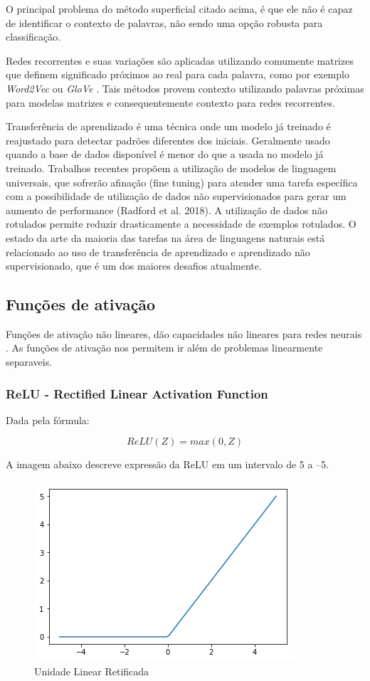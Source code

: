 \documentclass[12pt]{article}
\begin{document}
O principal problema do método superficial citado acima, é que ele não é capaz de identificar o contexto de palavras, não sendo uma opção robusta para classificação.

Redes recorrentes e suas variações são aplicadas utilizando comumente matrizes que definem significado próximos ao real para cada palavra, como por exemplo \textit{Word2Vec} \cite{DBLP:journals/corr/abs-1301-3781} ou \textit{GloVe} \cite{pennington2014glove}. Tais métodos provem contexto utilizando palavras próximas para modelas matrizes e consequentemente contexto para redes recorrentes.

Transferência de aprendizado é uma técnica onde um modelo já treinado é reajustado para detectar padrões diferentes dos iniciais. Geralmente usado quando a base de dados disponível é menor do que a usada no modelo já treinado. Trabalhos recentes propõem a utilização de modelos de linguagem universais, que sofrerão afinação (fine tuning) para atender uma tarefa específica \cite{DBLP:journals/corr/abs-1801-06146} com a possibilidade de utilização de dados não supervisionados para gerar um aumento de performance (Radford et al. 2018). A utilização de dados não rotulados permite reduzir drasticamente a necessidade de exemplos rotulados. O estado da arte da maioria das tarefas na área de linguagens naturais está relacionado ao uso de transferência de aprendizado e aprendizado não supervisionado, que é um dos maiores desafios atualmente.

\subsection{Funções de ativação}

Funções de ativação não lineares, dão capacidades não lineares para redes neurais \cite{lecun:98}. As funções de ativação nos permitem ir além de problemas linearmente separaveis.

\subsubsection{ReLU - Rectified Linear Activation Function}

Dada pela fórmula:

\begin{equation}
    ReLU(Z) = max(0, Z)
\end{equation}

A imagem abaixo descreve expressão da ReLU em um intervalo de 5 a –5.

\begin{figure}[ht]
\centering
\includegraphics[width=.5\textwidth]{images/relu.png}
\caption{Unidade Linear Retificada}
\label{fig:relu}
\end{figure}
\end{document}
